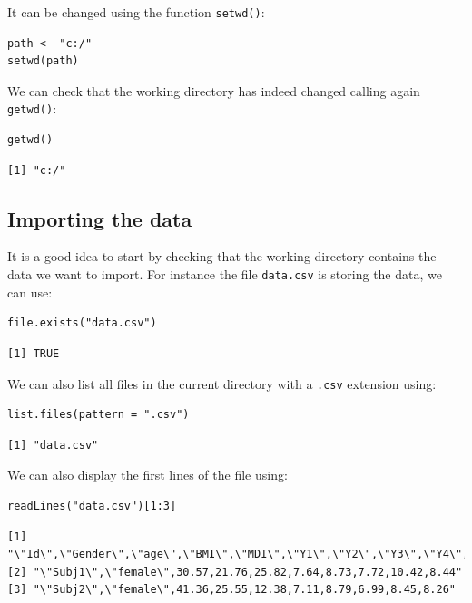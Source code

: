 \documentclass{article}
\begin{document}
It can be changed using the function \texttt{setwd()}:
\lstset{language=r,label= ,caption= ,captionpos=b,numbers=none}
\begin{lstlisting}
path <- "c:/"
setwd(path)
\end{lstlisting}

We can check that the working directory has indeed changed calling
again \texttt{getwd()}:
\lstset{language=r,label= ,caption= ,captionpos=b,numbers=none}
\begin{lstlisting}
getwd()
\end{lstlisting}

\begin{verbatim}
[1] "c:/"
\end{verbatim}

\subsection{Importing the data}
\label{sec:org63acd04}

It is a good idea to start by checking that the working directory
contains the data we want to import. For instance the file \texttt{data.csv}
is storing the data, we can use:
\lstset{language=r,label= ,caption= ,captionpos=b,numbers=none}
\begin{lstlisting}
file.exists("data.csv")
\end{lstlisting}

\begin{verbatim}
[1] TRUE
\end{verbatim}

We can also list all files in the current directory with a \texttt{.csv} extension using:
\lstset{language=r,label= ,caption= ,captionpos=b,numbers=none}
\begin{lstlisting}
list.files(pattern = ".csv")
\end{lstlisting}

\begin{verbatim}
[1] "data.csv"
\end{verbatim}

We can also display the first lines of the file using:
\lstset{language=r,label= ,caption= ,captionpos=b,numbers=none}
\begin{lstlisting}
readLines("data.csv")[1:3]
\end{lstlisting}

\begin{verbatim}
[1] "\"Id\",\"Gender\",\"age\",\"BMI\",\"MDI\",\"Y1\",\"Y2\",\"Y3\",\"Y4\",\"Y5\""
[2] "\"Subj1\",\"female\",30.57,21.76,25.82,7.64,8.73,7.72,10.42,8.44"            
[3] "\"Subj2\",\"female\",41.36,25.55,12.38,7.11,8.79,6.99,8.45,8.26"
\end{verbatim}
\end{document}
